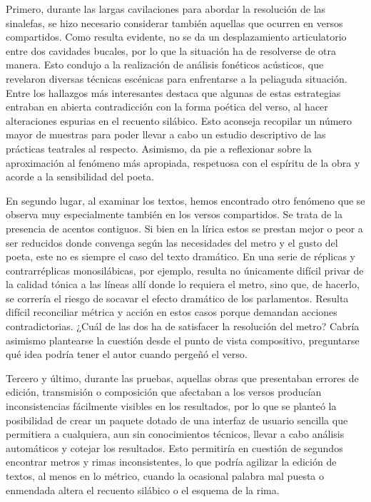 Primero, durante las largas cavilaciones para abordar la resolución de las sinalefas, se hizo necesario considerar también aquellas que ocurren en versos compartidos. Como resulta evidente, no se da un desplazamiento articulatorio entre dos cavidades bucales, por lo que la situación ha de resolverse de otra manera. Esto condujo a la realización de análisis fonéticos acústicos, que revelaron diversas técnicas escénicas para enfrentarse a la peliaguda situación. Entre los hallazgos más interesantes destaca que algunas de estas estrategias entraban en abierta contradicción con la forma poética del verso, al hacer alteraciones espurias en el recuento silábico. Esto aconseja recopilar un número mayor de muestras para poder llevar a cabo un estudio descriptivo de las prácticas teatrales al respecto. Asimismo, da pie a reflexionar sobre la aproximación al fenómeno más apropiada, respetuosa con el espíritu de la obra y acorde a la sensibilidad del poeta.

En segundo lugar, al examinar los textos, hemos encontrado otro fenómeno que se observa  muy especialmente también en los versos compartidos. Se trata de la presencia de acentos contiguos. Si bien en la lírica estos se prestan mejor o peor a ser reducidos donde convenga según las necesidades del metro y el gusto del poeta, este no es siempre el caso del texto dramático. En una serie de réplicas y contrarréplicas monosilábicas, por ejemplo, resulta no únicamente difícil privar de la calidad tónica a las líneas allí donde lo requiera el metro, sino que, de hacerlo, se correría el riesgo de socavar el efecto dramático de los parlamentos. Resulta difícil reconciliar métrica y acción en estos casos porque demandan acciones contradictorias. ¿Cuál de las dos ha de satisfacer la resolución del metro? Cabría asimismo plantearse la cuestión desde el punto de vista compositivo, preguntarse qué idea podría tener el autor cuando pergeñó el verso.

Tercero y último, durante las pruebas, aquellas obras que presentaban errores de edición, transmisión o composición que afectaban a los versos producían inconsistencias fácilmente visibles en los resultados, por lo que se planteó la posibilidad de crear un paquete dotado de una interfaz de usuario sencilla que permitiera a cualquiera, aun sin conocimientos técnicos, llevar a cabo análisis automáticos y cotejar los resultados. Esto permitiría en cuestión de segundos encontrar metros y rimas inconsistentes, lo que podría agilizar la edición de textos, al menos en lo métrico, cuando la ocasional palabra mal puesta o enmendada altera el recuento silábico o el esquema de la rima.

